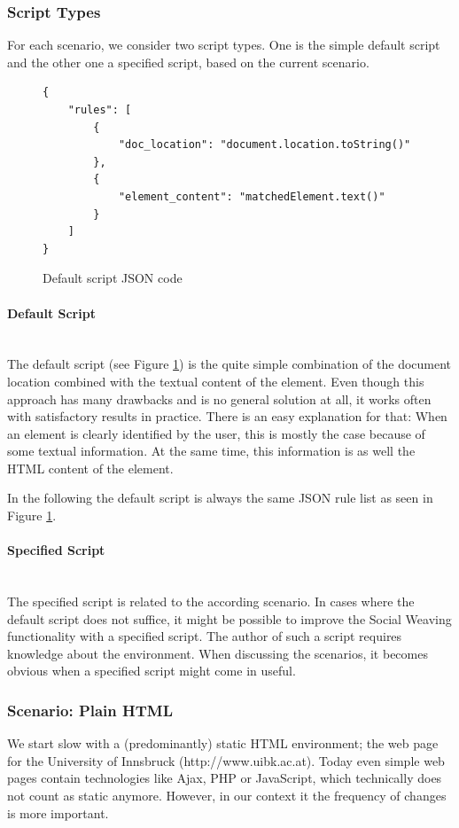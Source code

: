 \subsubsection{Script Types}
For each scenario, we consider two script types. One is the simple default script and the other one a specified script, based on the current scenario.

\begin{figure}\centering
\begin{lstlisting}
{
    "rules": [
        {
            "doc_location": "document.location.toString()"
        },
        {
            "element_content": "matchedElement.text()"
        }
    ]
}
\end{lstlisting}
		\caption{Default script JSON code}
		\label{default-script-code}
\end{figure} 

\paragraph{Default Script}\mbox{}\\
The default script (see Figure \ref{default-script-code}) is the quite simple combination of the document location combined with the textual content of the element. Even though this approach has many drawbacks and is no general solution at all, it works often with satisfactory results in practice. There is an easy explanation for that: When an element is clearly identified by the user, this is mostly the case because of some textual information. At the same time, this information is as well the HTML content of the element. 

In the following the default script is always the same JSON rule list as seen in Figure \ref{default-script-code}. 

\paragraph{Specified Script}\mbox{}\\
The specified script is related to the according scenario. In cases where the default script does not suffice, it might be possible to improve the Social Weaving functionality with a specified script. The author of such a script requires knowledge about the environment. When discussing the scenarios, it becomes obvious when a specified script might come in useful. 

\subsubsection{Scenario: Plain HTML}
We start slow with a (predominantly) static HTML environment; the web page for the University of Innsbruck (http://www.uibk.ac.at). Today even simple web pages contain technologies like Ajax, PHP or JavaScript, which technically does not count as static anymore. However, in our context it the frequency of changes is more important. 

